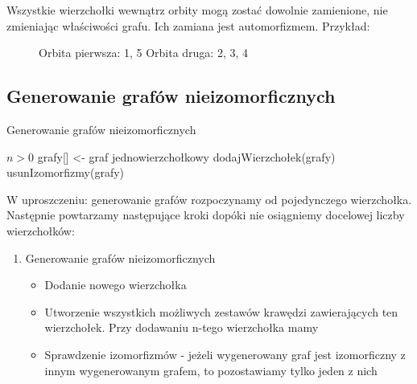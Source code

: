 \documentclass[11pt]{article}
\begin{document}
Wszystkie wierzchołki wewnątrz orbity mogą zostać dowolnie zamienione, nie zmieniając właściwości grafu. Ich zamiana jest automorfizmem.
Przykład: 
\begin{figure}[h]
  \centering
    \caption{Orbita pierwsza: 1, 5 
    Orbita druga: 2, 3, 4}
 \end{figure}
 

\subsection{Generowanie grafów nieizomorficznych} 

\begin{algorithm}
  \caption{Generowanie grafów nieizomorficznych}
  \begin{algorithmic}
  \REQUIRE $n > 0 $
  \STATE grafy[] <- graf jednowierzchołkowy 
    \STATE dodajWierzchołek(grafy)
    \STATE usunIzomorfizmy(grafy)
  \ENDWHILE
  \end{algorithmic}
\end{algorithm}

W uproszczeniu: generowanie grafów rozpoczynamy od pojedynczego wierzchołka.
Następnie powtarzamy następujące kroki dopóki nie osiągniemy docelowej liczby wierzchołków:
\begin{enumerate}
 \item Generowanie grafów nieizomorficznych 

 \begin{itemize}
 \item  Dodanie nowego wierzchołka  

 \item Utworzenie wszystkich możliwych zestawów krawędzi zawierających ten wierzchołek. Przy dodawaniu n-tego wierzchołka mamy 

 \item Sprawdzenie izomorfizmów - jeżeli wygenerowany graf jest izomorficzny z innym wygenerowanym grafem, to pozostawiamy tylko jeden z nich 
 
 \end{itemize}
\end{enumerate}
\end{document}
